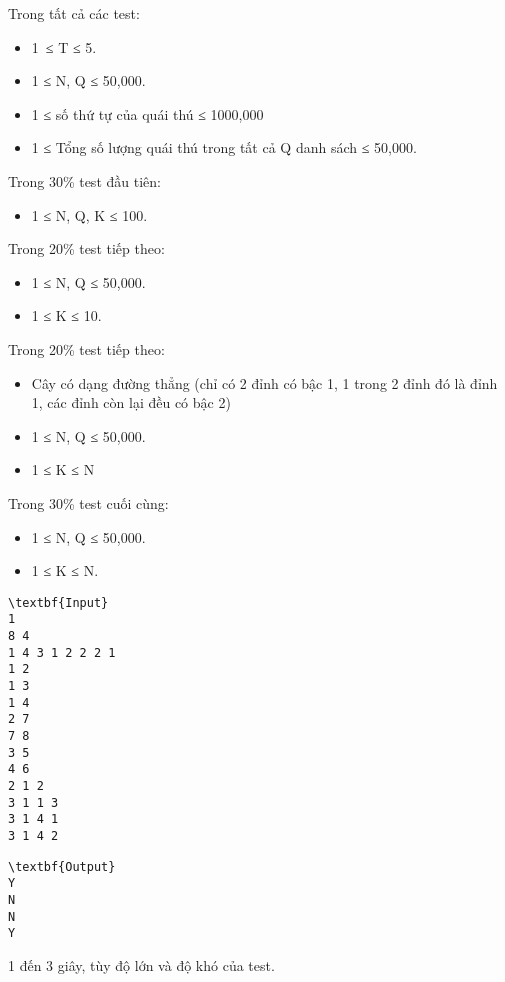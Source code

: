 Trong tất cả các test:
\begin{itemize}
	\item 1 ≤ T ≤ 5.
	\item 1 ≤ N, Q ≤ 50,000.
	\item 1 ≤ số thứ tự của quái thú ≤ 1000,000
	\item 1 ≤ Tổng số lượng quái thú trong tất cả Q danh sách ≤ 50,000.
\end{itemize}

Trong 30\% test đầu tiên:
\begin{itemize}
	\item 1 ≤ N, Q, K ≤ 100.
\end{itemize}

Trong 20\% test tiếp theo:
\begin{itemize}
	\item 1 ≤ N, Q ≤ 50,000.
	\item 1 ≤ K ≤ 10.
\end{itemize}

Trong 20\% test tiếp theo:
\begin{itemize}
	\item Cây có dạng đường thẳng (chỉ có 2 đỉnh có bậc 1, 1 trong 2 đỉnh đó là đỉnh 1, các đỉnh còn lại đều có bậc 2)
	\item 1 ≤ N, Q ≤ 50,000.
	\item 1 ≤ K ≤ N
\end{itemize}

Trong 30\% test cuối cùng:
\begin{itemize}
	\item 1 ≤ N, Q ≤ 50,000.
	\item 1 ≤ K ≤ N.
\end{itemize}
\begin{verbatim}
\textbf{Input}
1
8 4
1 4 3 1 2 2 2 1
1 2
1 3
1 4
2 7
7 8
3 5
4 6
2 1 2
3 1 1 3
3 1 4 1
3 1 4 2
\end{verbatim}
\begin{verbatim}
\textbf{Output}
Y
N
N
Y
\end{verbatim}
1 đến 3 giây, tùy độ lớn và độ khó của test.